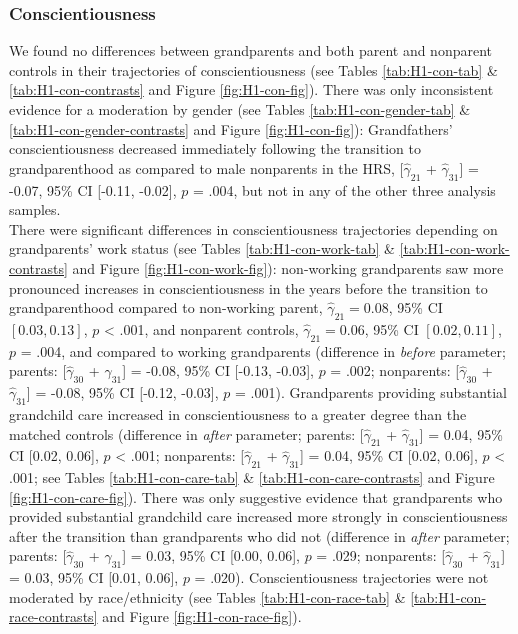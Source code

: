 \documentclass[
  english,
  man,floatsintext]{apa7}
\begin{document}
\hypertarget{conscientiousness}{%
\subsubsection{Conscientiousness}\label{conscientiousness}}

We found no differences between grandparents and both parent and nonparent controls in their trajectories of conscientiousness (see Tables \ref{tab:H1-con-tab} \& \ref{tab:H1-con-contrasts} and Figure \ref{fig:H1-con-fig}). There was only inconsistent evidence for a moderation by gender (see Tables \ref{tab:H1-con-gender-tab} \& \ref{tab:H1-con-gender-contrasts} and Figure \ref{fig:H1-con-fig}): Grandfathers' conscientiousness decreased immediately following the transition to grandparenthood as compared to male nonparents in the HRS, {[}\(\hat{\gamma}_{21}\) + \(\hat{\gamma}_{31}\){]} = -0.07, 95\% CI {[}-0.11, -0.02{]}, \(p\) = .004, but not in any of the other three analysis samples.\\
There were significant differences in conscientiousness trajectories depending on grandparents' work status (see Tables \ref{tab:H1-con-work-tab} \& \ref{tab:H1-con-work-contrasts} and Figure \ref{fig:H1-con-work-fig}): non-working grandparents saw more pronounced increases in conscientiousness in the years before the transition to grandparenthood compared to non-working parent, \(\hat{\gamma}_{21} = 0.08\), 95\% CI \([0.03, 0.13]\), \(p\) \textless{} .001, and nonparent controls, \(\hat{\gamma}_{21} = 0.06\), 95\% CI \([0.02, 0.11]\), \(p\) = .004, and compared to working grandparents (difference in \emph{before} parameter; parents: {[}\(\hat{\gamma}_{30}\) + \(\hat{\gamma}_{31}\){]} = -0.08, 95\% CI {[}-0.13, -0.03{]}, \(p\) = .002; nonparents: {[}\(\hat{\gamma}_{30}\) + \(\hat{\gamma}_{31}\){]} = -0.08, 95\% CI {[}-0.12, -0.03{]}, \(p\) = .001). Grandparents providing substantial grandchild care increased in conscientiousness to a greater degree than the matched controls (difference in \emph{after} parameter; parents: {[}\(\hat{\gamma}_{21}\) + \(\hat{\gamma}_{31}\){]} = 0.04, 95\% CI {[}0.02, 0.06{]}, \(p\) \textless{} .001; nonparents: {[}\(\hat{\gamma}_{21}\) + \(\hat{\gamma}_{31}\){]} = 0.04, 95\% CI {[}0.02, 0.06{]}, \(p\) \textless{} .001; see Tables \ref{tab:H1-con-care-tab} \& \ref{tab:H1-con-care-contrasts} and Figure \ref{fig:H1-con-care-fig}). There was only suggestive evidence that grandparents who provided substantial grandchild care increased more strongly in conscientiousness after the transition than grandparents who did not (difference in \emph{after} parameter; parents: {[}\(\hat{\gamma}_{30}\) + \(\hat{\gamma}_{31}\){]} = 0.03, 95\% CI {[}0.00, 0.06{]}, \(p\) = .029; nonparents: {[}\(\hat{\gamma}_{30}\) + \(\hat{\gamma}_{31}\){]} = 0.03, 95\% CI {[}0.01, 0.06{]}, \(p\) = .020). Conscientiousness trajectories were not moderated by race/ethnicity (see Tables \ref{tab:H1-con-race-tab} \& \ref{tab:H1-con-race-contrasts} and Figure \ref{fig:H1-con-race-fig}).
\end{document}
